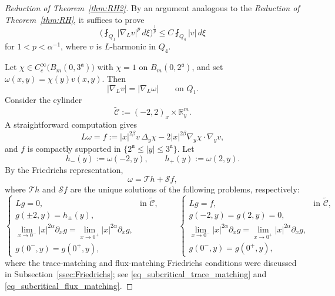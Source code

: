 \documentclass[12pt]{amsart}
\begin{document}
\begin{proof}[Reduction of Theorem~\ref{thm:RH2}]
By an argument analogous to the \textit{Reduction of Theorem~\ref{thm:RH}}, it suffices to prove
\begin{equation*}
    \biggl( \fint_{Q_1} |\nabla_L v|^p \, d\xi \biggr)^{\!\frac{1}{p}} \le C \fint_{Q_4} |v| \, d\xi
\end{equation*}
for $1<p<\alpha^{-1}$, where $v$ is $L$-harmonic in $Q_4$.

Let $\chi \in C_c^\infty\bigl( B_m( 0, 3^{\mathfrak a} ) \bigr)$ with $\chi = 1$ on $B_m( 0, 2^{\mathfrak a} )$, and set $\omega(x,y) = \chi(y) v(x,y)$. Then
\begin{equation*}
    |\nabla_L v| = |\nabla_L \omega| \qquad \text{on } Q_1.
\end{equation*}
Consider the cylinder
\begin{equation*}
    \widetilde{\mathcal{C}}:= (-2,2)_x \times \mathbb{R}^m_y.
\end{equation*}
A straightforward computation gives
\begin{equation*}
    L\omega = f:= |x|^{2\beta} v \, \Delta_y \chi - 2 |x|^{2\beta} \nabla_y \chi \cdot \nabla_y v,
\end{equation*}
and $f$ is compactly supported in $\{2^{\mathfrak a}\le |y|\le 3^{\mathfrak a}\}$. Let
\begin{equation*}
    h_-(y):= \omega(-2,y), \qquad h_+(y):= \omega(2,y).
\end{equation*}
By the Friedrichs representation,
\begin{equation*}
    \omega = \mathcal{T}h + \mathcal{S}f,
\end{equation*}
where $\mathcal{T}h$ and $\mathcal{S}f$ are the unique solutions of the following problems, respectively:
\begin{equation}\label{eq:pde:n=1}
    \begin{cases}
        Lg = 0, & \text{in } \widetilde{\mathcal{C}},\\
        g(\pm 2,y) = h_\pm(y), \\
        \lim_{x\to 0^-} |x|^{2\alpha}\partial_x g = \lim_{x\to 0^+} |x|^{2\alpha}\partial_x g,\\
        g(0^-,y) = g(0^+,y),
    \end{cases} \qquad
    \begin{cases}
        Lg = f, & \text{in } \widetilde{\mathcal{C}},\\
        g(-2,y)=g(2,y)=0,\\
        \lim_{x\to 0^-} |x|^{2\alpha}\partial_x g = \lim_{x\to 0^+} |x|^{2\alpha}\partial_x g,\\
        g(0^-,y) = g(0^+,y),
    \end{cases}
\end{equation}
where the trace-matching and flux-matching Friedrichs conditions were discussed in Subsection~\ref{ssec:Friedrichs}; see \eqref{eq_subcritical_trace_matching} and \eqref{eq_subcritical_flux_matching}.


\end{proof}
\end{document}
